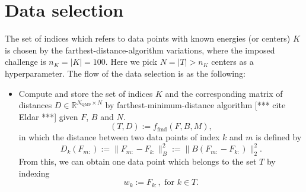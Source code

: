 \documentclass[12pt]{article}
\def\att{                    %
        \marginpar[ \hspace*{\fill} \raisebox{-0.2em}{\rule{2mm}{1.2em}} ]
        {\raisebox{-0.2em}{\rule{2mm}{1.2em}} }
        }
\def\at#1{[*** \att #1 ***]}  %
\begin{document}
\section{Data selection}
\label{sec:data}
The set of indices which refers to data points with known energies (or centers) $K$ is chosen by the farthest-distance-algorithm variations, where the imposed challenge is $n_K = |K| = 100$. Here we pick $N = |T| > n_K$ centers as a hyperparameter. The flow of the data selection is as the following:
\begin{itemize}
	\item Compute and store the set of indices $K$ and the corresponding matrix of distances $D \in \mathbb{R}^{N_\text{QM9} \times N}$ by farthest-minimum-distance algorithm \at{cite Eldar} given $F$, $B$ and $N$.
	\begin{equation}
		(T, D) := f_{\text{fmd}}(F, B, M),
	\end{equation}
	in which the distance between two data points of index $k$ and $m$ is defined by
	\begin{equation}
		D_k(F_{m:}) := \|F_{m:} - F_{k:}\|^2_B := \|B(F_{m:} - F_{k:})\|^2_2.
	\end{equation}
	From this, we can obtain one data point which belongs to the set $T$ by indexing
	\begin{equation}
		w_k := F_{k:}, \text{ for } k \in T.
	\end{equation}
\end{itemize}
\end{document}
